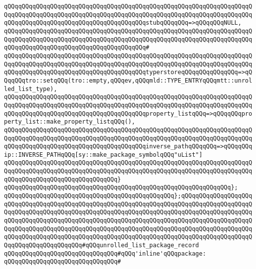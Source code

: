 \verb|qQQqqQQqqQQqqQQqqQQqqQQqqQQqqQQqqQQqqQQqqQQqqQQqqQQqqQQqqQQqqQQqqQQqqQQqqQQqqQQqqQQqqQQqqQQqqQQqqQQqqQQqqQQqqQQqqQQqqQQqqQQqqQQqqQQqqQQqqQQqqQQqqQQqqQQqqQQqqQQqqQQqqQQqqQQqqQQqqQQqstubqQQqqQQq=>qQQqqQQqNULL,|\newline
\verb|qQQqqQQqqQQqqQQqqQQqqQQqqQQqqQQqqQQqqQQqqQQqqQQqqQQqqQQqqQQqqQQqqQQqqQQqqQQqqQQqqQQqqQQqqQQqqQQqqQQqqQQqqQQqqQQqqQQqqQQqqQQqqQQqqQQqqQQqqQQqqQQqqQQqqQQqqQQqqQQqqQQqqQQqqQQqqQQqqQQq#|\newline
\verb|qQQqqQQqqQQqqQQqqQQqqQQqqQQqqQQqqQQqqQQqqQQqqQQqqQQqqQQqqQQqqQQqqQQqqQQqqQQqqQQqqQQqqQQqqQQqqQQqqQQqqQQqqQQqqQQqqQQqqQQqqQQqqQQqqQQqqQQqqQQqqQQqqQQqqQQqqQQqqQQqqQQqqQQqqQQqqQQqqQQqtyperstoreqQQqqQQqqQQqqQQq=>qQQqqQQqtro::setqQQq(tro::empty,qQQqev,qQQqmld::TYPE_ENTRYqQQqmtt::unrolled_list_type),|\newline
\verb|qQQqqQQqqQQqqQQqqQQqqQQqqQQqqQQqqQQqqQQqqQQqqQQqqQQqqQQqqQQqqQQqqQQqqQQqqQQqqQQqqQQqqQQqqQQqqQQqqQQqqQQqqQQqqQQqqQQqqQQqqQQqqQQqqQQqqQQqqQQqqQQqqQQqqQQqqQQqqQQqqQQqqQQqqQQqqQQqqQQqproperty_listqQQq=>qQQqqQQqproperty_list::make_property_listqQQq(),|\newline
\verb|qQQqqQQqqQQqqQQqqQQqqQQqqQQqqQQqqQQqqQQqqQQqqQQqqQQqqQQqqQQqqQQqqQQqqQQqqQQqqQQqqQQqqQQqqQQqqQQqqQQqqQQqqQQqqQQqqQQqqQQqqQQqqQQqqQQqqQQqqQQqqQQqqQQqqQQqqQQqqQQqqQQqqQQqqQQqqQQqqQQqinverse_pathqQQqqQQq=>qQQqqQQqip::INVERSE_PATHqQQq[sy::make_package_symbolqQQq"uList"]|\newline
\verb|qQQqqQQqqQQqqQQqqQQqqQQqqQQqqQQqqQQqqQQqqQQqqQQqqQQqqQQqqQQqqQQqqQQqqQQqqQQqqQQqqQQqqQQqqQQqqQQqqQQqqQQqqQQqqQQqqQQqqQQqqQQqqQQqqQQqqQQqqQQqqQQqqQQqqQQqqQQqqQQqqQQqqQQqqQQq}|\newline
\verb|qQQqqQQqqQQqqQQqqQQqqQQqqQQqqQQqqQQqqQQqqQQqqQQqqQQqqQQqqQQqqQQq};|\newline
\verb|qQQqqQQqqQQqqQQqqQQqqQQqqQQqqQQqqQQqqQQqqQQqqQQq};qQQqqQQqqQQqqQQqqQQqqQQqqQQqqQQqqQQqqQQqqQQqqQQqqQQqqQQqqQQqqQQqqQQqqQQqqQQqqQQqqQQqqQQqqQQqqQQqqQQqqQQqqQQqqQQqqQQqqQQqqQQqqQQqqQQqqQQqqQQqqQQqqQQqqQQqqQQqqQQqqQQqqQQqqQQqqQQqqQQqqQQqqQQqqQQqqQQqqQQqqQQqqQQqqQQqqQQqqQQqqQQqqQQqqQQqqQQqqQQqqQQqqQQqqQQqqQQqqQQqqQQqqQQqqQQqqQQqqQQqqQQqqQQqqQQqqQQqqQQqqQQqqQQqqQQqqQQqqQQqqQQqqQQqqQQqqQQqqQQqqQQqqQQqqQQqqQQqqQQqqQQqqQQqqQQqqQQqqQQqqQQqqQQqqQQq#qQQqunrolled_list_package_record|\newline
\newline
\verb|qQQqqQQqqQQqqQQqqQQqqQQqqQQqqQQq#qQQq'inline'qQQqpackage:|\newline
\verb|qQQqqQQqqQQqqQQqqQQqqQQqqQQqqQQq#|\newline

